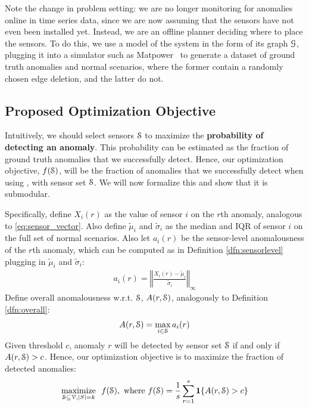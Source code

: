 Note the change in problem setting: we are no longer monitoring for anomalies online in time series data, since we are now assuming that the sensors have not even been installed yet. Instead, we are an offline planner deciding where to place the sensors. To do this, we use a model of the system in the form of its graph $\G$, plugging it into a simulator such as Matpower~\cite{zimmerman2011matpower} to generate a dataset of ground truth anomalies and normal scenarios, where the former contain a randomly chosen edge deletion, and the latter do not.


\subsection{Proposed Optimization Objective}

Intuitively, we should select sensors $\S$ to maximize the {\bf probability of detecting an anomaly}. This probability can be estimated as the fraction of ground truth anomalies that we successfully detect. Hence, our optimization objective, $f(\S)$, will be the fraction of anomalies that we successfully detect when using \methodD, with sensor set $\S$. We will now formalize this and show that it is submodular.

Specifically, define $X_i(r)$ as the value of sensor $i$ on the $r$th anomaly, analogous to \eqref{eq:sensor_vector}. Also define $\tilde{\mu}_i$ and $\tilde{\sigma}_i$ as the median and IQR of sensor $i$ on the full set of normal scenarios. 
Also let $a_i(r)$ be the sensor-level anomalousness of the $r$th anomaly, which can be computed as in Definition \ref{dfn:sensorlevel} plugging in $\tilde{\mu}_i$ and $\tilde{\sigma}_i$: 
\begin{align} \label{eq:a_greedy}
a_i(r) = \left\Vert \frac{X_i(r) - \tilde{\mu}_i}{\tilde{\sigma}_i}\right\Vert_\infty
\end{align} 
Define overall anomalousness w.r.t. $\S$, $A(r, \S)$, analogously to Definition \ref{dfn:overall}:
\begin{align}
A(r, \S) = \max_{i \in \S} a_i(r)
\end{align} 
Given threshold $c$, anomaly $r$ will be detected by sensor set $\S$ if and only if $A(r,\S) > c$. Hence, our optimization objective is to maximize the fraction of detected anomalies:
\begin{align}
\underset{\S \subseteq \V, |S| = k}{\text{maximize}} \ \ f(\S), \text{ where } f(\S) = \frac{1}{s}\sum_{r=1}^s \mathbf{1}\{ A(r, \S) > c \}
\end{align}
